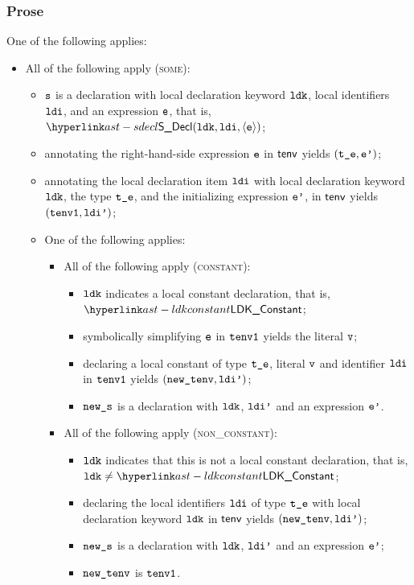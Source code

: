 \subsubsection{Prose}
One of the following applies:
\begin{itemize}
  \item All of the following apply (\textsc{some}):
  \begin{itemize}
    \item $\texttt{s}$ is a declaration with local declaration keyword $\texttt{ldk}$, local identifiers $\texttt{ldi}$, and an expression $\texttt{e}$,
          that is, $\SDecl(\ldk, \ldi, \langle\ve\rangle)$;
    \item annotating the right-hand-side expression $\texttt{e}$ in $\textsf{tenv}$ yields $(\texttt{t\_e},\texttt{e'})$\ProseOrTypeError;
    \item annotating the local declaration item $\texttt{ldi}$ with local declaration keyword $\texttt{ldk}$, the type $\texttt{t\_e}$,
          and the initializing expression $\texttt{e'}$, in $\textsf{tenv}$
          yields $(\texttt{tenv1}, \texttt{ldi'})$;
    \item One of the following applies:
    \begin{itemize}
      \item All of the following apply (\textsc{constant}):
      \begin{itemize}
        \item $\texttt{ldk}$ indicates a local constant declaration, that is, $\LDKConstant$;
        \item symbolically simplifying $\texttt{e}$ in $\texttt{tenv1}$ yields the literal $\texttt{v}$\ProseOrTypeError;
        \item declaring a local constant of type $\texttt{t\_e}$, literal $\texttt{v}$ and identifier $\texttt{ldi}$ in $\texttt{tenv1}$ yields $(\texttt{new\_tenv}, \texttt{ldi'})$;
        \item $\texttt{new\_s}$ is a declaration with $\texttt{ldk}$, $\texttt{ldi'}$ and an expression $\texttt{e'}$.
      \end{itemize}

      \item All of the following apply (\textsc{non\_constant}):
      \begin{itemize}
        \item $\texttt{ldk}$ indicates that this is not a local constant declaration, that is, $\ldk\neq\LDKConstant$;
        \item declaring the local identifiers $\texttt{ldi}$ of type $\texttt{t\_e}$ with local declaration keyword $\texttt{ldk}$ in $\textsf{tenv}$
              yields $(\texttt{new\_tenv}, \texttt{ldi'})$;
        \item $\texttt{new\_s}$ is a declaration with $\texttt{ldk}$, $\texttt{ldi'}$ and an expression $\texttt{e'}$;
        \item $\texttt{new\_tenv}$ is $\texttt{tenv1}$.
      \end{itemize}
    \end{itemize}
  \end{itemize}


\end{itemize}
